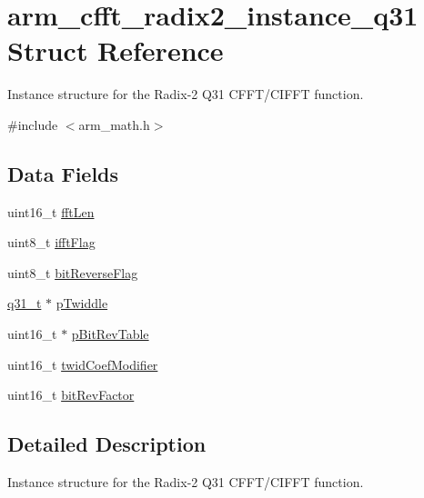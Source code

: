 \hypertarget{structarm__cfft__radix2__instance__q31}{}\section{arm\+\_\+cfft\+\_\+radix2\+\_\+instance\+\_\+q31 Struct Reference}
\label{structarm__cfft__radix2__instance__q31}


Instance structure for the Radix-\/2 Q31 C\+F\+F\+T/\+C\+I\+F\+FT function.  




{\ttfamily \#include $<$arm\+\_\+math.\+h$>$}

\subsection*{Data Fields}
\begin{DoxyCompactItemize}
\item 
uint16\+\_\+t \mbox{\hyperlink{structarm__cfft__radix2__instance__q31_ab8db3bbe7c61e6bb8ca2a55e3446e11a}{fft\+Len}}
\item 
uint8\+\_\+t \mbox{\hyperlink{structarm__cfft__radix2__instance__q31_ad6ca6e223f986ebfd94c5ee1e410aa73}{ifft\+Flag}}
\item 
uint8\+\_\+t \mbox{\hyperlink{structarm__cfft__radix2__instance__q31_a09a221a818c6d0e064557a99e2fe9a8b}{bit\+Reverse\+Flag}}
\item 
\mbox{\hyperlink{arm__math_8h_adc89a3547f5324b7b3b95adec3806bc0}{q31\+\_\+t}} $\ast$ \mbox{\hyperlink{structarm__cfft__radix2__instance__q31_a2505b7d5ec077b244c712797a5253b6d}{p\+Twiddle}}
\item 
uint16\+\_\+t $\ast$ \mbox{\hyperlink{structarm__cfft__radix2__instance__q31_a46a2fb328199897af100fea0bfdf59aa}{p\+Bit\+Rev\+Table}}
\item 
uint16\+\_\+t \mbox{\hyperlink{structarm__cfft__radix2__instance__q31_afe772e5b5001c9d8e85032115a8df5bf}{twid\+Coef\+Modifier}}
\item 
uint16\+\_\+t \mbox{\hyperlink{structarm__cfft__radix2__instance__q31_a33386d95319dc3ee7097b3a8e52e01ec}{bit\+Rev\+Factor}}
\end{DoxyCompactItemize}


\subsection{Detailed Description}
Instance structure for the Radix-\/2 Q31 C\+F\+F\+T/\+C\+I\+F\+FT function. 

